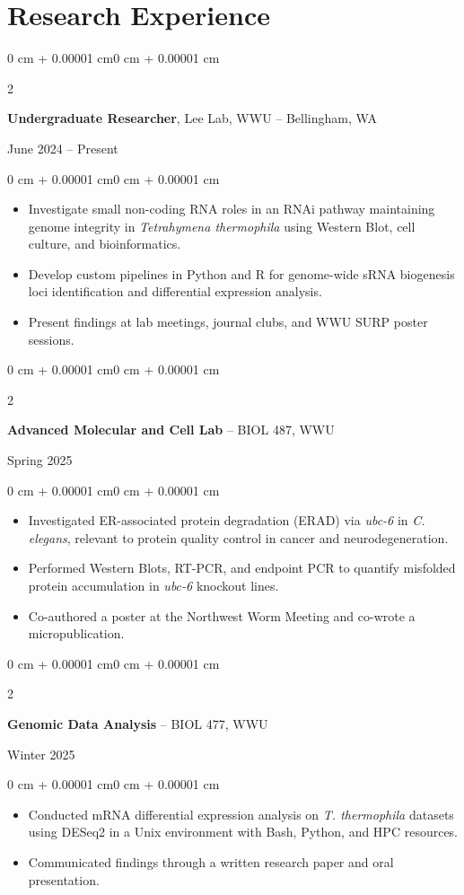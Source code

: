\documentclass[10pt]{article}
\newenvironment{highlights}{
    \begin{itemize}[
        topsep=0.02 cm,
        parsep=0.02 cm,
        partopsep=0pt,
        itemsep=0pt,
        leftmargin=0 cm + 8pt
    ]
}{
    \end{itemize}
}
\newenvironment{onecolentry}{
    \begin{adjustwidth}{0 cm + 0.00001 cm}{0 cm + 0.00001 cm}
}{
    \end{adjustwidth}
}
\newenvironment{twocolentry}[2][]{
    \onecolentry
    \def\secondColumn{#2}
    \setcolumnwidth{\fill, 4.5 cm}
    \begin{paracol}{2}
}{
    \switchcolumn \raggedleft \secondColumn
    \end{paracol}
    \endonecolentry
}
\begin{document}
\section{Research Experience}

\begin{twocolentry}{June 2024 -- Present}
	\textbf{Undergraduate Researcher}, Lee Lab, WWU -- Bellingham, WA
\end{twocolentry}
\begin{onecolentry}
	\begin{highlights}
		\item Investigate small non-coding RNA roles in an RNAi pathway maintaining genome integrity in \textit{Tetrahymena thermophila} using Western Blot, cell culture, and bioinformatics.
		\item Develop custom pipelines in Python and R for genome-wide sRNA biogenesis loci identification and differential expression analysis.
		\item Present findings at lab meetings, journal clubs, and WWU SURP poster sessions.
	\end{highlights}
\end{onecolentry}

\vspace{0.08 cm}

\begin{twocolentry}{Spring 2025}
	\textbf{Advanced Molecular and Cell Lab} -- BIOL 487, WWU
\end{twocolentry}
\begin{onecolentry}
	\begin{highlights}
		\item Investigated ER-associated protein degradation (ERAD) via \textit{ubc-6} in \textit{C. elegans}, relevant to protein quality control in cancer and neurodegeneration.
		\item Performed Western Blots, RT-PCR, and endpoint PCR to quantify misfolded protein accumulation in \textit{ubc-6} knockout lines.
		\item Co-authored a poster at the Northwest Worm Meeting and co-wrote a micropublication.
	\end{highlights}
\end{onecolentry}

\vspace{0.08 cm}

\begin{twocolentry}{Winter 2025}
	\textbf{Genomic Data Analysis} -- BIOL 477, WWU
\end{twocolentry}
\begin{onecolentry}
	\begin{highlights}
		\item Conducted mRNA differential expression analysis on \textit{T. thermophila} datasets using DESeq2 in a Unix environment with Bash, Python, and HPC resources.
		\item Communicated findings through a written research paper and oral presentation.
	\end{highlights}
\end{onecolentry}
\end{document}
